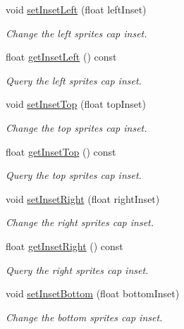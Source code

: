 \begin{DoxyCompactItemize}
void \hyperlink{classui_1_1Scale9Sprite_a7c74dd002fd7fbd2a2afdfc2e69be278}{set\+Inset\+Left} (float left\+Inset)
\begin{DoxyCompactList}\small\item\em Change the left sprite\textquotesingle{}s cap inset. \end{DoxyCompactList}\item 
float \hyperlink{classui_1_1Scale9Sprite_a580d1f1c795a4c6fbb1432dd2af34f55}{get\+Inset\+Left} () const
\begin{DoxyCompactList}\small\item\em Query the left sprite\textquotesingle{}s cap inset. \end{DoxyCompactList}\item 
void \hyperlink{classui_1_1Scale9Sprite_a451123a4d8cd3c734aecdce03ad59ae0}{set\+Inset\+Top} (float top\+Inset)
\begin{DoxyCompactList}\small\item\em Change the top sprite\textquotesingle{}s cap inset. \end{DoxyCompactList}\item 
float \hyperlink{classui_1_1Scale9Sprite_a1e67b994f74f374826d160290ff432d4}{get\+Inset\+Top} () const
\begin{DoxyCompactList}\small\item\em Query the top sprite\textquotesingle{}s cap inset. \end{DoxyCompactList}\item 
void \hyperlink{classui_1_1Scale9Sprite_a7276d1dcf47579a368948f1cf84a3c41}{set\+Inset\+Right} (float right\+Inset)
\begin{DoxyCompactList}\small\item\em Change the right sprite\textquotesingle{}s cap inset. \end{DoxyCompactList}\item 
float \hyperlink{classui_1_1Scale9Sprite_ad31142787308264a812f7c204dab97f0}{get\+Inset\+Right} () const
\begin{DoxyCompactList}\small\item\em Query the right sprite\textquotesingle{}s cap inset. \end{DoxyCompactList}\item 
void \hyperlink{classui_1_1Scale9Sprite_ad0a272ccfedc20c30359371daddd6fd3}{set\+Inset\+Bottom} (float bottom\+Inset)
\begin{DoxyCompactList}\small\item\em Change the bottom sprite\textquotesingle{}s cap inset. \end{DoxyCompactList}\item 

\end{DoxyCompactItemize}
